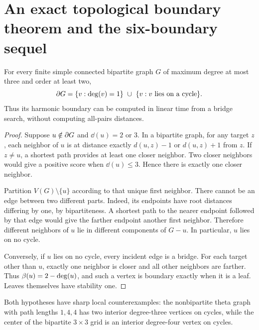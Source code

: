 \section{An exact topological boundary theorem and the six-boundary sequel}\label{sec:bipartite-subcubic}
\begin{theorem}\label{thm:bipartite-subcubic}
For every finite simple connected bipartite graph $G$ of maximum degree at
most three and order at least two,
\[
 \partial G=\{v:\operatorname{deg}(v)=1\}\ \cup\ \{v:v\text{ lies on a cycle}\}.
\]
Thus its harmonic boundary can be computed in linear time from a bridge
search, without computing all-pairs distances.
\end{theorem}
\begin{proof}
Suppose $u\notin\partial G$ and $\dd(u)=2$ or $3$. In a bipartite graph,
for any target $z$, each neighbor of $u$ is at distance exactly
$d(u,z)-1$ or $d(u,z)+1$ from $z$. If $z\ne u$, a shortest path provides
at least one closer neighbor. Two closer neighbors would give a positive
score when $\dd(u)\le3$. Hence there is exactly one closer neighbor.

Partition $V(G)\setminus\{u\}$ according to that unique first neighbor.
There cannot be an edge between two different parts. Indeed, its endpoints
have root distances differing by one, by bipartiteness. A shortest path to
the nearer endpoint followed by that edge would give the farther endpoint
another first neighbor. Therefore different neighbors of $u$ lie in
different components of $G-u$. In particular, $u$ lies on no cycle.

Conversely, if $u$ lies on no cycle, every incident edge is a bridge.
For each target other than $u$, exactly one neighbor is closer and all
other neighbors are farther. Thus $\beta(u)=2-\operatorname{deg}(u)$, and such a vertex
is boundary exactly when it is a leaf. Leaves themselves have stability one.
\end{proof}
Both hypotheses have sharp local counterexamples: the nonbipartite theta
graph with path lengths $1,4,4$ has two interior degree-three vertices on
cycles, while the center of the bipartite $3\times3$ grid is an interior
degree-four vertex on cycles.

